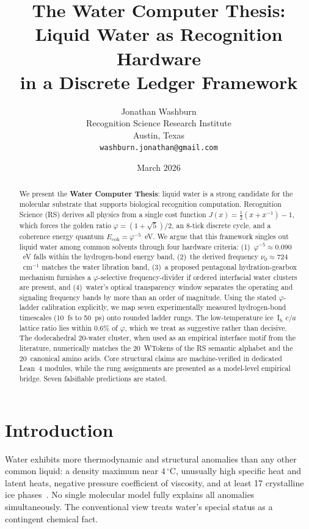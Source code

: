 \documentclass[12pt,a4paper]{article}
\title{The Water Computer Thesis:\\
Liquid Water as Recognition Hardware\\
in a Discrete Ledger Framework}
\author{Jonathan Washburn\\
Recognition Science Research Institute\\
Austin, Texas\\
\texttt{washburn.jonathan@gmail.com}}
\date{March 2026}
\theoremstyle{definition}
\theoremstyle{remark}
\begin{document}
\maketitle

\begin{abstract}
We present the \textbf{Water Computer Thesis}: liquid water is a strong
candidate for the molecular substrate that supports biological
recognition computation.  Recognition Science (RS) derives all physics
from a single cost function $J(x) = \tfrac{1}{2}(x + x^{-1}) - 1$, which
forces the golden ratio $\varphi = (1+\sqrt{5})/2$, an 8-tick discrete
cycle, and a coherence energy quantum $E_{\mathrm{coh}} =
\varphi^{-5}$~eV.  We argue that this framework singles out liquid
water among common solvents through four hardware criteria:
(1)~$\varphi^{-5} \approx 0.090$~eV falls within the hydrogen-bond
energy band, (2)~the derived frequency $\nu_0 \approx 724$~cm$^{-1}$
matches the water libration band, (3)~a proposed pentagonal
hydration-gearbox mechanism furnishes a $\varphi$-selective
frequency-divider if ordered interfacial water clusters are present,
and (4)~water's optical transparency window separates the operating and
signaling frequency bands by more than an order of magnitude.  Using
the stated $\varphi$-ladder calibration explicitly, we map seven
experimentally measured hydrogen-bond timescales (10~fs to 50~ps) onto
rounded ladder rungs.  The low-temperature ice~I$_h$ $c/a$ lattice
ratio lies within $0.6\%$ of $\varphi$, which we treat as suggestive
rather than decisive.  The dodecahedral 20-water cluster, when used as
an empirical interface motif from the literature, numerically matches
the 20~WTokens of the RS semantic alphabet and the 20~canonical amino
acids.  Core structural claims are machine-verified in dedicated
Lean~4 modules, while the rung assignments are presented as a model-level
empirical bridge.  Seven falsifiable predictions are stated.
\end{abstract}

\section{Introduction}
\label{sec:intro}

Water exhibits more thermodynamic and structural anomalies than any other
common liquid: a density maximum near $4\,^\circ$C, unusually high
specific heat and latent heats, negative pressure coefficient of
viscosity, and at least 17 crystalline ice
phases~\cite{Chaplin2006,BallWater2008}.  No single molecular model
fully explains all anomalies simultaneously.  The conventional view
treats water's special status as a contingent chemical fact.
\end{document}
